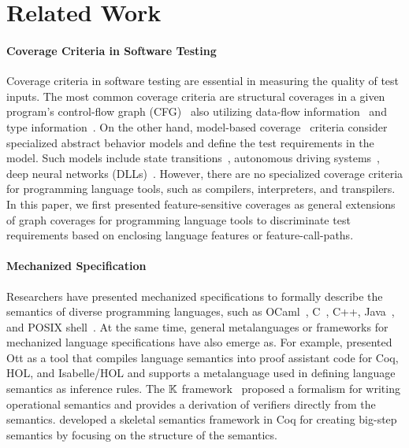\section{Related Work}\label{sec:related}

\paragraph{\textbf{Coverage Criteria in Software Testing}}
Coverage criteria in software testing are essential in measuring the quality of test inputs.
The most common coverage criteria are structural coverages in a given program's
control-flow graph (CFG)~\cite{cov-mcdc,cov-def} also utilizing
data-flow information~\cite{cov-dataflow} and type information~\cite{cov-partition}.
On the other hand, model-based coverage~\cite{cov-model-book} criteria consider
specialized abstract behavior models and define the test requirements in the model.
Such models include state transitions~\cite{cov-model-api},
autonomous driving systems~\cite{cov-param},
deep neural networks (DLLs)~\cite{cov-neuron,cov-k-neuron,cov-concolic-dll,
cov-fuzz-tensor, cov-fuzz-dl}.
However, there are no specialized coverage criteria for programming language
tools, such as compilers, interpreters, and transpilers.
In this paper, we first presented feature-sensitive coverages as general
extensions of graph coverages for programming language tools to discriminate
test requirements based on enclosing language features or feature-call-paths.


\paragraph{\textbf{Mechanized Specification}}

Researchers have presented mechanized specifications to formally describe the
semantics of diverse programming languages, such as
OCaml~\cite{ocaml-light-spec}, C~\cite{c-light-spec}, C++\cite{cpp-spec},
Java~\cite{k-java}, and POSIX shell~\cite{posix-shell-spec}.
%
At the same time, general metalanguages or frameworks for mechanized language
specifications have also emerge as.
%
For example, \citet{ott} presented Ott as a tool that compiles language
semantics into proof assistant code for Coq, HOL, and Isabelle/HOL and supports
a metalanguage used in defining language semantics as inference rules.
%
The $\mathbb{K}$ framework~\cite{kframework} proposed a formalism for writing
operational semantics and provides a derivation of verifiers directly from the
semantics.
%
\citet{skel} developed a skeletal semantics framework in Coq for creating
big-step semantics by focusing on the structure of the semantics.

